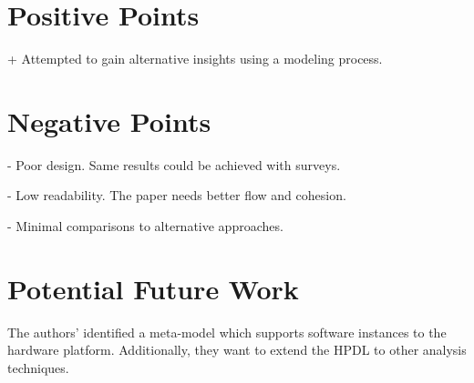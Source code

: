 \documentclass[conference]{IEEEtran}
\begin{document}
\section{Positive Points}
+ Attempted to gain alternative insights using a modeling process. 

\section{Negative Points}
- Poor design. Same results could be achieved with surveys.

- Low readability. The paper needs better flow and cohesion.

- Minimal comparisons to alternative approaches. 

\section{Potential Future Work}
The authors' identified a meta-model which supports software instances to the hardware platform. Additionally, they want to extend the HPDL to other analysis techniques. 
 

%
%


\end{document}
